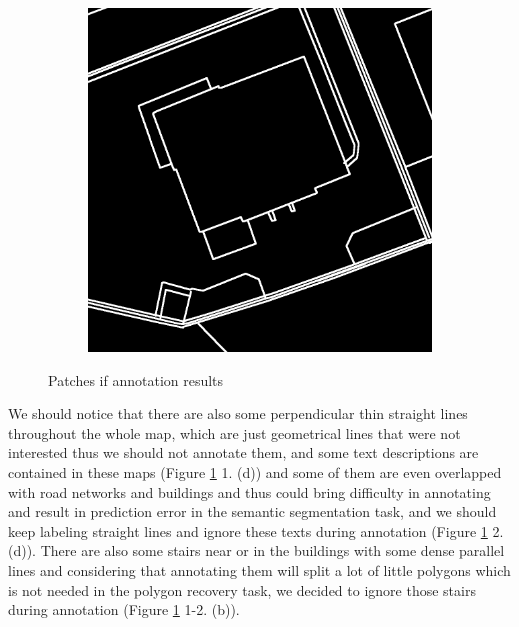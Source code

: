 \documentclass[12pt]{article}
\begin{document}
\begin{figure}[H]
\begin{subfigure}[b]{.235\textwidth}
\begin{minipage}[t]{1\linewidth}
		    \caption{ }
		\end{minipage}
	\end{subfigure}
	\begin{subfigure}[b]{.235\textwidth}
		\begin{minipage}[t]{1\linewidth}
			\centering
			\includegraphics[width=1\linewidth]{images/patches/gt7.png}
		    \caption{ }
		\end{minipage}
	\end{subfigure}
	
    \caption{Patches if annotation results}
    \label{fig:anno_res}
\end{figure}

We should notice that there are also some perpendicular thin straight lines throughout the whole map, which are just geometrical lines that were not interested thus we should not annotate them, and some text descriptions are contained in these maps (Figure \ref{fig:anno_res} 1. (d)) and some of them are even overlapped with road networks and buildings and thus could bring difficulty in annotating and result in prediction error in the semantic segmentation task, and we should keep labeling straight lines and ignore these texts during annotation (Figure \ref{fig:anno_res} 2. (d)). There are also some stairs near or in the buildings with some dense parallel lines and considering that annotating them will split a lot of little polygons which is not needed in the polygon recovery task, we decided to ignore those stairs during annotation (Figure \ref{fig:anno_res} 1-2. (b)).
\end{document}
